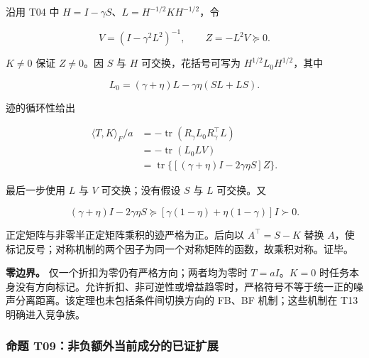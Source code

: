 \documentclass[11pt,a4paper]{article}
\begin{document}
\par
\noindent\begin{minipage}{\linewidth}

沿用 T04 中 \(H=I-\gamma S\)、\(L=H^{-1/2}KH^{-1/2}\)，令

\[
V=(I-\gamma^2L^2)^{-1},
\qquad Z=-L^2V\succeq0.
\]

\end{minipage}\par

\(K\ne0\) 保证 \(Z\ne0\)。因 \(S\) 与 \(H\) 可交换，花括号可写为
\(H^{1/2}L_0H^{1/2}\)，其中

\[
L_0=(\gamma+\eta)L-\gamma\eta(SL+LS).
\]

\par
\noindent\begin{minipage}{\linewidth}

迹的循环性给出

\[
\begin{aligned}
\langle T,K\rangle_F/a
&=-\operatorname{tr}(R_\gamma L_0R_\gamma^\top L)\\
&=-\operatorname{tr}(L_0LV)\\
&=\operatorname{tr}\{[(\gamma+\eta)I-2\gamma\eta S]Z\}.
\end{aligned}
\]

\end{minipage}\par

\par
\noindent\begin{minipage}{\linewidth}

最后一步使用 \(L\) 与 \(V\) 可交换；没有假设 \(S\) 与 \(L\) 可交换。又

\[
(\gamma+\eta)I-2\gamma\eta S
\succeq[\gamma(1-\eta)+\eta(1-\gamma)]I\succ0.
\]

\end{minipage}\par

正定矩阵与非零半正定矩阵乘积的迹严格为正。后向以 \(A^\top=S-K\) 替换
\(A\)，使标记反号；对称机制的两个因子为同一个对称矩阵的函数，故乘积对称。证毕。

\textbf{零边界。} 仅一个折扣为零仍有严格方向；两者均为零时
\(T=aI\)。\(K=0\)
时任务本身没有方向标记。允许折扣、非可逆性或增益趋零时，严格符号不等于统一正的噪声分离距离。该定理也未包括条件间切换方向的
FB、BF 机制；这些机制在 T13 明确进入竞争族。

\subsubsection{命题
T09：非负额外当前成分的已证扩展}\label{ux547dux9898-t09ux975eux8d1fux989dux5916ux5f53ux524dux6210ux5206ux7684ux5df2ux8bc1ux6269ux5c55}
\end{document}
